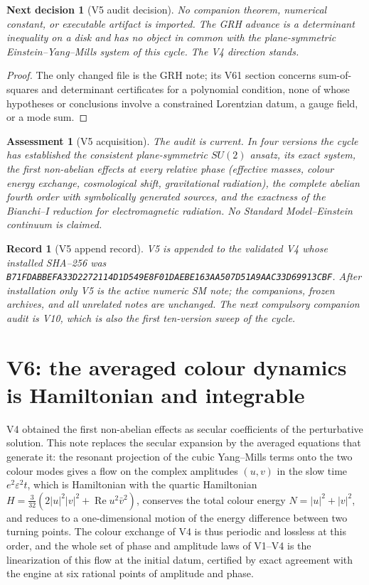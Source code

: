 \documentclass[11pt]{article}
\newtheorem{decision}[theorem]{Next decision}
\newtheorem{assessment}[theorem]{Assessment}
\newtheorem{record}[theorem]{Record}
\theoremstyle{remark}
\begin{document}
\begin{decision}[V5 audit decision]
\label{dec:v20v5-audit}
No companion theorem, numerical constant, or executable artifact is
imported.  The GRH advance is a determinant inequality on a disk and
has no object in common with the plane-symmetric Einstein--Yang--Mills
system of this cycle.  The V4 direction stands.
\end{decision}

\begin{proof}
The only changed file is the GRH note; its V61 section concerns
sum-of-squares and determinant certificates for a polynomial
condition, none of whose hypotheses or conclusions involve a
constrained Lorentzian datum, a gauge field, or a mode sum.
\end{proof}

\begin{assessment}[V5 acquisition]
\label{ass:v20v5}
The audit is current.  In four versions the cycle has established
the consistent plane-symmetric \(SU(2)\) ansatz, its exact system,
the first non-abelian effects at every relative phase (effective
masses, colour energy exchange, cosmological shift, gravitational
radiation), the complete abelian fourth order with symbolically
generated sources, and the exactness of the Bianchi--I reduction for
electromagnetic radiation.  No Standard Model--Einstein continuum is
claimed.
\end{assessment}

\begin{record}[V5 append record]
\label{rec:v20v5}
V5 is appended to the validated V4 whose installed SHA--256 was
\texttt{B71FDABBEFA33D2272114D1D549E8F01DAEBE163AA507D51A9AAC33D69913CBF}.
After installation only V5 is the active numeric SM note; the
companions, frozen archives, and all unrelated notes are unchanged.
The next compulsory companion audit is V10, which is also the first
ten-version sweep of the cycle.
\end{record}


\section{V6: the averaged colour dynamics is Hamiltonian and integrable}
\label{sec:v20v6}

V4 obtained the first non-abelian effects as secular coefficients of
the perturbative solution.  This note replaces the secular expansion
by the averaged equations that generate it: the resonant projection of
the cubic Yang--Mills terms onto the two colour modes gives a flow on
the complex amplitudes \((u,v)\) in the slow time \(e^2\varepsilon^2t\),
which is Hamiltonian with the quartic Hamiltonian
\(H=\tfrac3{32}(2|u|^2|v|^2+\operatorname{Re}u^2\bar v^2)\), conserves
the total colour energy \(N=|u|^2+|v|^2\), and reduces to a
one-dimensional motion of the energy difference between two turning
points.  The colour exchange of V4 is thus periodic and lossless at
this order, and the whole set of phase and amplitude laws of V1--V4 is
the linearization of this flow at the initial datum, certified by
exact agreement with the engine at six rational points of amplitude
and phase.
\end{document}
